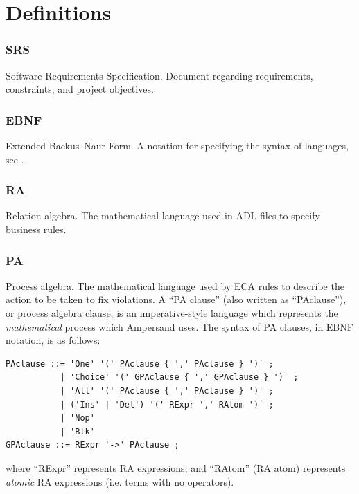 \documentclass[12pt]{report}
\begin{document}
\section{Definitions}\label{sec:Abbrev}

\subsubsection*{SRS}
Software Requirements Specification. Document regarding requirements, constraints, and project objectives.

\subsubsection*{EBNF}
Extended Backus–Naur Form. A notation for specifying the syntax of languages, see \cite{ebnf}.

\subsubsection*{RA}
Relation algebra. The mathematical language used in ADL files to specify business rules. 

\subsubsection*{PA}
Process algebra. The mathematical language used by ECA rules to describe the
action to be taken to fix violations. A ``PA clause'' (also written as
``PAclause''), or process algebra clause, is an imperative-style language which
represents the \emph{mathematical} process which Ampersand uses. The syntax of
PA clauses, in EBNF notation, is as follows: 

\begin{lstlisting}[basicstyle=\ttfamily]
PAclause ::= 'One' '(' PAclause { ',' PAclause } ')' ; 
           | 'Choice' '(' GPAclause { ',' GPAclause } ')' ;  
           | 'All' '(' PAclause { ',' PAclause } ')' ;  
           | ('Ins' | 'Del') '(' RExpr ',' RAtom ')' ; 
           | 'Nop'  
           | 'Blk' 
GPAclause ::= RExpr '->' PAclause ; 
\end{lstlisting}
where ``RExpr'' represents RA expressions, and ``RAtom'' (RA atom) represents
\emph{atomic} RA expressions (i.e. terms with no operators).
\end{document}
